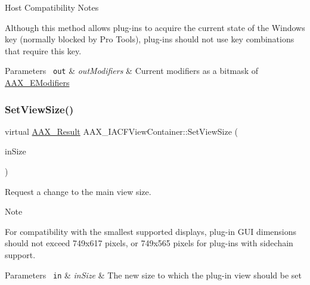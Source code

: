 \begin{DoxyRefDesc}{Host Compatibility Notes}
\item[\mbox{\hyperlink{a00786__compatibility_notes000064}{Host Compatibility Notes}}]Although this method allows plug-\/ins to acquire the current state of the Windows key (normally blocked by Pro Tools), plug-\/ins should not use key combinations that require this key.\end{DoxyRefDesc}



\begin{DoxyParams}[1]{Parameters}
\mbox{\texttt{ out}}  & {\em out\+Modifiers} & Current modifiers as a bitmask of \mbox{\hyperlink{a00491_a47756e0a56d00468b7045eb26500cb78}{A\+A\+X\+\_\+\+E\+Modifiers}} \\
\hline
\end{DoxyParams}
\mbox{\label{a01765_a51e307abdc817dc20582e87d5b0b32e3}} 
\subsubsection{\texorpdfstring{SetViewSize()}{SetViewSize()}}
{\footnotesize\ttfamily virtual \mbox{\hyperlink{a00392_a4d8f69a697df7f70c3a8e9b8ee130d2f}{A\+A\+X\+\_\+\+Result}} A\+A\+X\+\_\+\+I\+A\+C\+F\+View\+Container\+::\+Set\+View\+Size (\begin{DoxyParamCaption}\item[{\mbox{\hyperlink{a01609}{A\+A\+X\+\_\+\+Point}} \&}]{in\+Size }\end{DoxyParamCaption})\hspace{0.3cm}{\ttfamily [pure virtual]}}



Request a change to the main view size. 

\begin{DoxyNote}{Note}
\begin{DoxyItemize}
\item For compatibility with the smallest supported displays, plug-\/in G\+UI dimensions should not exceed 749x617 pixels, or 749x565 pixels for plug-\/ins with sidechain support.\end{DoxyItemize}

\end{DoxyNote}

\begin{DoxyParams}[1]{Parameters}
\mbox{\texttt{ in}}  & {\em in\+Size} & The new size to which the plug-\/in view should be set \\
\hline
\end{DoxyParams}
\mbox{\label{a01765_aef633dc27ae6b8691d2add3c12158de0}} 

